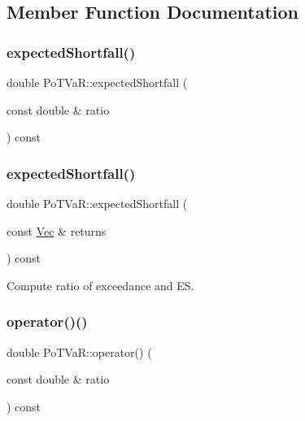 \subsection{Member Function Documentation}
\hypertarget{classPoTVaR_a2a133206a1cec2c101cb68402c3c4041}{}\label{classPoTVaR_a2a133206a1cec2c101cb68402c3c4041} 
\subsubsection{\texorpdfstring{expected\+Shortfall()}{expectedShortfall()}\hspace{0.1cm}{\footnotesize\ttfamily [1/2]}}
{\footnotesize\ttfamily double Po\+T\+Va\+R\+::expected\+Shortfall (\begin{DoxyParamCaption}\item[{const double \&}]{ratio }\end{DoxyParamCaption}) const}

\hypertarget{classPoTVaR_ad89b58b1c90111b1af8568a16e8d6b96}{}\label{classPoTVaR_ad89b58b1c90111b1af8568a16e8d6b96} 
\subsubsection{\texorpdfstring{expected\+Shortfall()}{expectedShortfall()}\hspace{0.1cm}{\footnotesize\ttfamily [2/2]}}
{\footnotesize\ttfamily double Po\+T\+Va\+R\+::expected\+Shortfall (\begin{DoxyParamCaption}\item[{const \hyperlink{compute__returns__eigen_8h_a1eb6a9306ef406d7975f3cbf2e247777}{Vec} \&}]{returns }\end{DoxyParamCaption}) const}



Compute ratio of exceedance and ES. 

\hypertarget{classPoTVaR_a7ee10c78ebe9cc0961e4344734860c97}{}\label{classPoTVaR_a7ee10c78ebe9cc0961e4344734860c97} 
\subsubsection{\texorpdfstring{operator()()}{operator()()}\hspace{0.1cm}{\footnotesize\ttfamily [1/2]}}
{\footnotesize\ttfamily double Po\+T\+Va\+R\+::operator() (\begin{DoxyParamCaption}\item[{const double \&}]{ratio }\end{DoxyParamCaption}) const}

